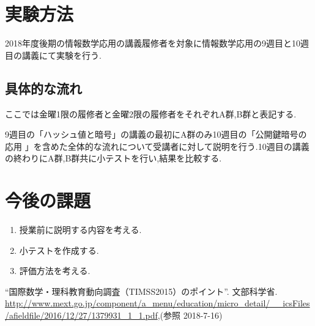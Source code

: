 \documentclass{jsarticle}
\begin{document}
\section{実験方法}
2018年度後期の情報数学応用の講義履修者を対象に情報数学応用の9週目と10週目の講義にて実験を行う.

\subsection{具体的な流れ}
ここでは金曜1限の履修者と金曜2限の履修者をそれぞれA群,B群と表記する.


9週目の「ハッシュ値と暗号」の講義の最初にA群のみ10週目の「公開鍵暗号の応用
」を含めた全体的な流れについて受講者に対して説明を行う.10週目の講義の終わりにA群,B群共に小テストを行い,結果を比較する.


\section{今後の課題}

\begin{enumerate}
\renewcommand {\labelenumi}{(\arabic{enumi})}
\item 授業前に説明する内容を考える.
\item 小テストを作成する.
\item 評価方法を考える.
\end{enumerate}




\begin{thebibliography}{99}
 “国際数学・理科教育動向調査（TIMSS2015）のポイント”. 文部科学省.  \url{http://www.mext.go.jp/component/a_menu/education/micro_detail/__icsFiles/afieldfile/2016/12/27/1379931_1_1.pdf},(参照 2018-7-16)

\end{thebibliography}
\end{document}
